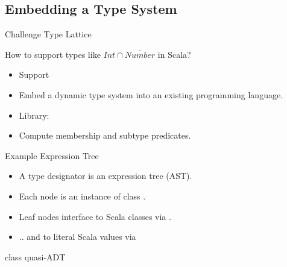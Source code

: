 \subsection{Embedding a Type System}

{  
\begin{frame}{Challenge }{Type Lattice}

  How to support types like $Int\cap\overline{Number}$ in Scala?

  \begin{itemize}
  \item   Support 
  \item Embed a dynamic type system into an existing programming language.
  \item Library: 
  \item Compute membership and subtype predicates.
  \end{itemize}

\end{frame}
}



\newsavebox\tdast
\begin{lrbox}{\tdast}
  \begin{minipage}{11cm}
    
  \end{minipage}
\end{lrbox}


\begin{frame}{Example  Expression Tree}
  \usebox\tdast

  \medskip

  \centering

  \scalebox{0.7}{}
  \begin{itemize}
  \item A type designator is an expression tree (AST).
  \item Each node is an instance of class .
  \item Leaf nodes interface to Scala classes via .
  \item .. and to literal Scala values via 
  \end{itemize}
\end{frame}


\begin{frame}{ class quasi-ADT}
  \scalebox{0.95}{}

\end{frame}


